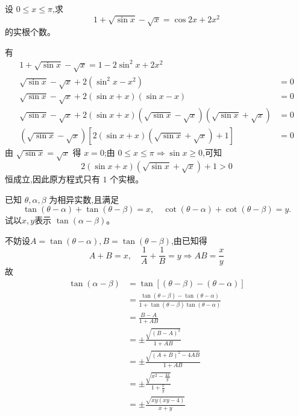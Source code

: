 \begin{questions}
    \question 设 $0 \le x \le \pi$,求 
    \[
    1+\sqrt{\sin x} - \sqrt{x} = \cos 2x + 2x^2
    \] 
    的实根个数。
    \begin{solution}
        有
        \begin{align*}
        1+\sqrt{\sin x}- \sqrt x = 1-2\sin^2 x+2x^2& \\
        \sqrt{\sin x}-\sqrt x +2(\sin^2 x-x^2)&=0 \\
        \sqrt{\sin x}-\sqrt x +2(\sin x+x)(\sin x-x) &=0 \\
        \sqrt{\sin x}-\sqrt x +2(\sin x+x)(\sqrt{\sin x}-\sqrt x)(\sqrt{\sin x}+\sqrt x)&=0 \\
        (\sqrt{\sin x}-\sqrt x)\left[2(\sin x+x) (\sqrt{\sin x}+\sqrt x)+1\right]&=0
        \end{align*}
        由 $\sqrt{\sin x}=\sqrt x$ 得 $x=0$;由 $0\le x\le \pi \Rightarrow \sin x \ge 0$,可知 
        \[
        2(\sin x+x) (\sqrt{\sin x}+\sqrt x)+1>0
        \] 恒成立,因此原方程式只有 $1$ 个实根。
    \end{solution}

    \question 已知 $\theta,\alpha,\beta$ 为相异实数,且满足
    \[
    \tan(\theta-\alpha)+\tan(\theta-\beta)=x, \quad 
    \cot(\theta-\alpha)+\cot(\theta-\beta)=y.
    \]
    试以$x,y$表示 $\tan(\alpha-\beta)$。
    \begin{solution}
        不妨设$A = \tan(\theta-\alpha), B = \tan(\theta-\beta)$,由已知得
        \[
        A+B = x, \quad \frac{1}{A}+\frac{1}{B} = y \Rightarrow AB = \frac{x}{y}
        \]
        故
        \begin{align*}
        \tan(\alpha-\beta) 
        &= \tan[(\theta-\beta) - (\theta-\alpha)] \\
        &= \frac{\tan(\theta-\beta)-\tan(\theta-\alpha)}{1+\tan(\theta-\beta)\tan(\theta-\alpha)} \\
        &= \frac{B-A}{1+AB} \\
        &= \pm \frac{\sqrt{(B-A)^2}}{1+AB} \\
        &= \pm \frac{\sqrt{(A+B)^2 - 4AB}}{1+AB} \\
        &= \pm \frac{\sqrt{x^2 - \frac{4x}{y}}}{1 + \frac{x}{y}} \\
        &= \pm \frac{\sqrt{xy(xy - 4)}}{x+y}
        \end{align*}
    \end{solution}


\end{questions}
